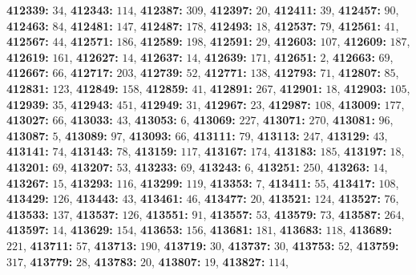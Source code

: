 \textsf{\bfseries 412339:} $34$, \textsf{\bfseries 412343:} $114$, \textsf{\bfseries 412387:} $309$, \textsf{\bfseries 412397:} $20$, \textsf{\bfseries 412411:} $39$, \textsf{\bfseries 412457:} $90$, \textsf{\bfseries 412463:} $84$, \textsf{\bfseries 412481:} $147$, \textsf{\bfseries 412487:} $178$, \textsf{\bfseries 412493:} $18$, \textsf{\bfseries 412537:} $79$, \textsf{\bfseries 412561:} $41$, \textsf{\bfseries 412567:} $44$, \textsf{\bfseries 412571:} $186$, \textsf{\bfseries 412589:} $198$, \textsf{\bfseries 412591:} $29$, \textsf{\bfseries 412603:} $107$, \textsf{\bfseries 412609:} $187$, \textsf{\bfseries 412619:} $161$, \textsf{\bfseries 412627:} $14$, \textsf{\bfseries 412637:} $14$, \textsf{\bfseries 412639:} $171$, \textsf{\bfseries 412651:} $2$, \textsf{\bfseries 412663:} $69$, \textsf{\bfseries 412667:} $66$, \textsf{\bfseries 412717:} $203$, \textsf{\bfseries 412739:} $52$, \textsf{\bfseries 412771:} $138$, \textsf{\bfseries 412793:} $71$, \textsf{\bfseries 412807:} $85$, \textsf{\bfseries 412831:} $123$, \textsf{\bfseries 412849:} $158$, \textsf{\bfseries 412859:} $41$, \textsf{\bfseries 412891:} $267$, \textsf{\bfseries 412901:} $18$, \textsf{\bfseries 412903:} $105$, \textsf{\bfseries 412939:} $35$, \textsf{\bfseries 412943:} $451$, \textsf{\bfseries 412949:} $31$, \textsf{\bfseries 412967:} $23$, \textsf{\bfseries 412987:} $108$, \textsf{\bfseries 413009:} $177$, \textsf{\bfseries 413027:} $66$, \textsf{\bfseries 413033:} $43$, \textsf{\bfseries 413053:} $6$, \textsf{\bfseries 413069:} $227$, \textsf{\bfseries 413071:} $270$, \textsf{\bfseries 413081:} $96$, \textsf{\bfseries 413087:} $5$, \textsf{\bfseries 413089:} $97$, \textsf{\bfseries 413093:} $66$, \textsf{\bfseries 413111:} $79$, \textsf{\bfseries 413113:} $247$, \textsf{\bfseries 413129:} $43$, \textsf{\bfseries 413141:} $74$, \textsf{\bfseries 413143:} $78$, \textsf{\bfseries 413159:} $117$, \textsf{\bfseries 413167:} $174$, \textsf{\bfseries 413183:} $185$, \textsf{\bfseries 413197:} $18$, \textsf{\bfseries 413201:} $69$, \textsf{\bfseries 413207:} $53$, \textsf{\bfseries 413233:} $69$, \textsf{\bfseries 413243:} $6$, \textsf{\bfseries 413251:} $250$, \textsf{\bfseries 413263:} $14$, \textsf{\bfseries 413267:} $15$, \textsf{\bfseries 413293:} $116$, \textsf{\bfseries 413299:} $119$, \textsf{\bfseries 413353:} $7$, \textsf{\bfseries 413411:} $55$, \textsf{\bfseries 413417:} $108$, \textsf{\bfseries 413429:} $126$, \textsf{\bfseries 413443:} $43$, \textsf{\bfseries 413461:} $46$, \textsf{\bfseries 413477:} $20$, \textsf{\bfseries 413521:} $124$, \textsf{\bfseries 413527:} $76$, \textsf{\bfseries 413533:} $137$, \textsf{\bfseries 413537:} $126$, \textsf{\bfseries 413551:} $91$, \textsf{\bfseries 413557:} $53$, \textsf{\bfseries 413579:} $73$, \textsf{\bfseries 413587:} $264$, \textsf{\bfseries 413597:} $14$, \textsf{\bfseries 413629:} $154$, \textsf{\bfseries 413653:} $156$, \textsf{\bfseries 413681:} $181$, \textsf{\bfseries 413683:} $118$, \textsf{\bfseries 413689:} $221$, \textsf{\bfseries 413711:} $57$, \textsf{\bfseries 413713:} $190$, \textsf{\bfseries 413719:} $30$, \textsf{\bfseries 413737:} $30$, \textsf{\bfseries 413753:} $52$, \textsf{\bfseries 413759:} $317$, \textsf{\bfseries 413779:} $28$, \textsf{\bfseries 413783:} $20$, \textsf{\bfseries 413807:} $19$, \textsf{\bfseries 413827:} $114$, 
